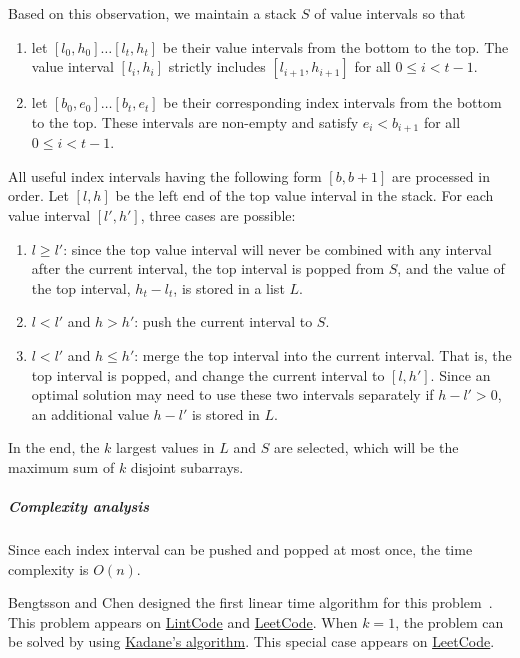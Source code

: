 \begin{Answer}
Based on this observation, we maintain a stack $S$ of value intervals so that
\begin{enumerate}
\item let $[l_0, h_0] \dots [l_t, h_t]$ be their value intervals from the bottom to the top. The value interval $[l_i, h_i]$ strictly includes $[l_{i + 1}, h_{i + 1}]$ for all $0 \leq i < t - 1$.
\item let $[b_0, e_0] \dots [b_t, e_t]$ be their corresponding index intervals from the bottom to the top. These intervals are non-empty and satisfy $e_i < b_{i + 1}$ for all $0 \leq i < t - 1$.
\end{enumerate}

All useful index intervals having the following form $[b, b + 1]$ are processed in order.
Let $[l, h]$ be the left end of the top value interval in the stack.
For each value interval $[l', h']$, three cases are possible:
\begin{enumerate}
\item $l \geq l'$: since the top value interval will never be combined with any interval after the current interval, the top interval is popped from $S$, and the value of the top interval, $h_t - l_t$, is stored in a list $L$.
\item $l < l'$ and $h > h'$: push the current interval to $S$.
\item $l < l'$ and $h \leq h'$: merge the top interval into the current interval. That is, the top interval is popped, and change the current interval to $[l, h']$. Since an optimal solution may need to use these two intervals separately if $h - l' > 0$, an additional value $h - l'$ is stored in $L$.
\end{enumerate}
In the end, the $k$ largest values in $L$ and $S$ are selected, which will be the maximum sum of $k$ disjoint subarrays.

\subparagraph{Complexity analysis} Since each index interval can be pushed and popped at most once, the time complexity is $O(n)$.
\begin{remark}
Bengtsson and Chen designed the first linear time algorithm for this problem~\cite{Gawrychowski2015}.
This problem appears on \href{http://www.lintcode.com/en/problem/maximum-subarray-iii/}{LintCode} and \href{https://leetcode.com/problems/best-time-to-buy-and-sell-stock-iv/}{LeetCode}.
When $k = 1$, the problem can be solved by using \href{https://en.wikipedia.org/wiki/Maximum_subarray_problem#Kadane.27s_algorithm}{Kadane's algorithm}. This special case appears on \href{https://leetcode.com/problems/maximum-subarray/}{LeetCode}.
\end{remark}
\end{Answer}

